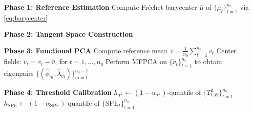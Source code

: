 \documentclass{article}
\newcommand{\algoname}{\textsc{IDD}\xspace}
\theoremstyle{plain}
\theoremstyle{definition}
\theoremstyle{remark}
\begin{document}
\begin{algorithm}[t]
\caption{\algoname --- Pre-Change Calibration}
\label{alg:calibration}
\SetAlgoLined
\DontPrintSemicolon
{}


\BlankLine
\textbf{Phase 1: Reference Estimation}\;
Compute Fr\'echet barycenter $\bar\mu$ of $\{\mu_t\}_{t=1}^{n_0}$ via \cref{eq:barycenter}\;

\BlankLine
\textbf{Phase 2: Tangent Space Construction}\;

\BlankLine
\textbf{Phase 3: Functional PCA}\;
Compute reference mean $\bar v = \tfrac{1}{n_0}\sum_{t=1}^{n_0} v_t$\;
Center fields: $\tilde v_t = v_t - \bar v$, for $t=1,\dots,n_0$\;
Perform MFPCA on $\{\tilde{v}_t\}_{t=1}^{n_0}$ to obtain eigenpairs $\{(\widehat\phi_m, \widehat\lambda_m)\}_{m=1}^{n_0-1}$\;

\BlankLine
\textbf{Phase 4: Threshold Calibration}\;
$h_{T^2} \leftarrow (1-\alpha_{T^2})$-quantile of $\{T_{t,K}^2\}_{t=1}^{n_0}$\;
$h_{\mathrm{SPE}} \leftarrow (1-\alpha_{\mathrm{SPE}})$-quantile of $\{\mathrm{SPE}_t\}_{t=1}^{n_0}$\;

\end{algorithm}
\end{document}
